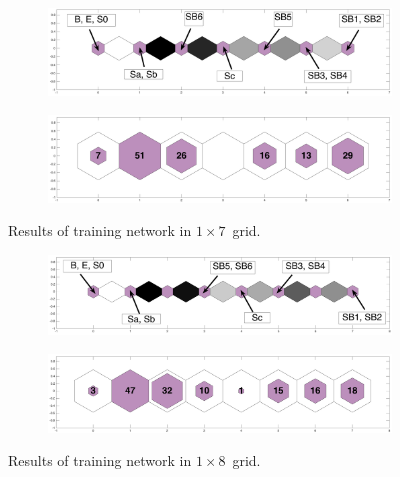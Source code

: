     \begin{figure}
        \begin{subfigure}[b]{0.5\textwidth}
            \centering
            \includegraphics[width=\textwidth]{../images0.01/1d/apps/dist_1_by_7.png}
        \end{subfigure}
        \hfill
        \begin{subfigure}[b]{0.5\textwidth}
             \includegraphics[width=\textwidth]{../images0.01/1d/apps/hit_v_1_by_7.png}
        \end{subfigure}
                \caption{Results of training network in $1\times7$~grid.}
         \label{fig: 1by7T}
    \end{figure}
    
    \begin{figure}
        \begin{subfigure}[b]{0.5\textwidth}
            \centering
            \includegraphics[width=\textwidth]{../images0.01/1d/apps/dist_1_by_8.png}
        \end{subfigure}
        \hfill
        \begin{subfigure}[b]{0.5\textwidth}
             \includegraphics[width=\textwidth]{../images0.01/1d/apps/hit_v_1_by_8.png}
        \end{subfigure}
                \caption{Results of training network in $1\times8$~grid.}
         \label{fig: 1by8T}
    \end{figure}
    
